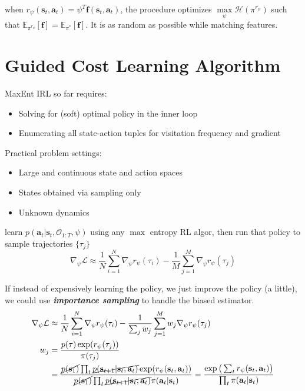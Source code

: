  when $r_\psi(\textbf{s}_t, \textbf{a}_t) = \psi^T \textbf{f}(\textbf{s}_t, \textbf{a}_t)$, the procedure optimizes $\underset{\psi}{\max} \mathcal{H}(\pi^{r_\psi})$ such that $\mathbb{E}_{\pi^{r_\psi}} [\textbf{f}] = \mathbb{E}_{\pi^*} [\textbf{f}]$. It is as random as possible while matching features. \cite{ziebart2008maximum}


\section{Guided Cost Learning Algorithm}
 \ac{MaxEnt} \ac{IRL} so far requires:
\begin{itemize}
	\item Solving for (soft) optimal policy in the inner loop
	\item Enumerating all state-action tuples for visitation frequency and gradient
\end{itemize}

Practical problem settings:
\begin{itemize}
	\item Large and continuous state and action spaces
	\item States obtained via sampling only
	\item Unknown dynamics
\end{itemize}

 learn $p(\textbf{a}_t | \textbf{s}_t, \mathcal{O}_{1:T}, \psi)$ using any $\max$ entropy \ac{RL} \ac{algor}, then run that policy to sample trajectories $\{\tau_j\}$
\begin{equation}
	\nabla_\psi \mathcal{L} \approx \frac{1}{N} \sum_{i=1}^N \nabla_\psi r_\psi(\tau_i) - \frac{1}{M} \sum_{j=1}^M \nabla_\psi r_\psi(\tau_j)
\end{equation}

If instead of expensively learning the policy, we just improve the policy (a little), we could use \textbf{\textit{importance sampling}} to handle the biased estimator. \cite{finn2016guided}
\begin{align}
	\nabla_\psi \mathcal{L} &\approx \frac{1}{N} \sum_{i=1}^N \nabla_\psi r_\psi(\tau_i) - \frac{1}{\sum_j w_j} \sum_{j=1}^M w_j \nabla_\psi r_\psi(\tau_j)\\
	w_j &= \frac{p(\tau) \exp(r_\psi(\tau_j))}{\pi(\tau_j)}\\
	&= \frac{\cancel{p(\textbf{s}_1)} \prod_t \cancel{p(\textbf{s}_{t+1} | \textbf{s}_t, \textbf{a}_t)} \exp(r_\psi(\textbf{s}_t, \textbf{a}_t))}{\cancel{p(\textbf{s}_1)} \prod_t \cancel{p(\textbf{s}_{t+1} | \textbf{s}_t, \textbf{a}_t)} \pi(\textbf{a}_t | \textbf{s}_t)} = \frac{\exp \big( \sum_t r_\psi(\textbf{s}_t, \textbf{a}_t) \big)}{\prod_t \pi(\textbf{a}_t | \textbf{s}_t)}
\end{align}

